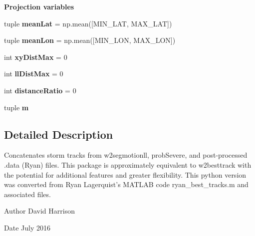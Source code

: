 \begin{Indent}{\bf Projection variables}\par
\begin{DoxyCompactItemize}
\item 
\hypertarget{namespacebest__track_a602262f3f1af414e004798321f6c3526}{tuple {\bfseries mean\-Lat} = np.\-mean(\mbox{[}M\-I\-N\-\_\-\-L\-A\-T, M\-A\-X\-\_\-\-L\-A\-T\mbox{]})}\label{namespacebest__track_a602262f3f1af414e004798321f6c3526}

\item 
\hypertarget{namespacebest__track_a689fdc7e3d45183d46dbdb85c5114018}{tuple {\bfseries mean\-Lon} = np.\-mean(\mbox{[}M\-I\-N\-\_\-\-L\-O\-N, M\-A\-X\-\_\-\-L\-O\-N\mbox{]})}\label{namespacebest__track_a689fdc7e3d45183d46dbdb85c5114018}

\item 
\hypertarget{namespacebest__track_a1e0a2c8b5aea6474974c39aa070ae3e7}{int {\bfseries xy\-Dist\-Max} = 0}\label{namespacebest__track_a1e0a2c8b5aea6474974c39aa070ae3e7}

\item 
\hypertarget{namespacebest__track_ab1d7dcaed55cd10abe6811353957d4bd}{int {\bfseries ll\-Dist\-Max} = 0}\label{namespacebest__track_ab1d7dcaed55cd10abe6811353957d4bd}

\item 
\hypertarget{namespacebest__track_ac85dda825c35219088dd9babe17b00cc}{int {\bfseries distance\-Ratio} = 0}\label{namespacebest__track_ac85dda825c35219088dd9babe17b00cc}

\item 
tuple {\bfseries m}
\end{DoxyCompactItemize}
\end{Indent}


\subsection{Detailed Description}
Concatenates storm tracks from w2segmotionll, prob\-Severe, and post-\/processed .data (Ryan) files. This package is approximately equivalent to w2besttrack with the potential for additional features and greater flexibility. This python version was converted from Ryan Lagerquist's M\-A\-T\-L\-A\-B code ryan\-\_\-best\-\_\-tracks.\-m and associated files.

\begin{DoxyAuthor}{Author}
David Harrison 
\end{DoxyAuthor}
\begin{DoxyDate}{Date}
July 2016 
\end{DoxyDate}


